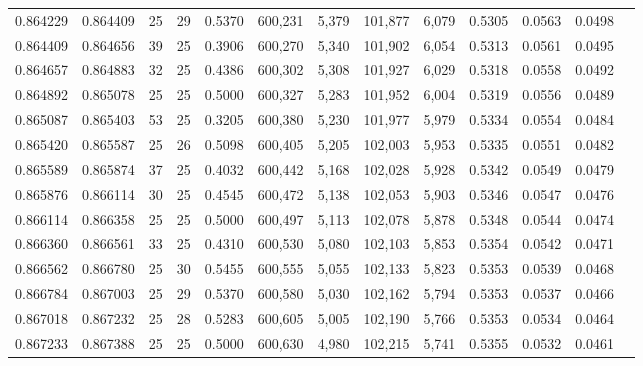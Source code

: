 \begin{tabular}{rrrrrrrrrrrrr}
0.864229 & 0.864409 &    25 &  29 &                                     0.5370 & 600,231 &   5,379 & 101,877 &   6,079 & 0.5305 & 0.0563 & 0.0498 \\
0.864409 & 0.864656 &    39 &  25 &                                     0.3906 & 600,270 &   5,340 & 101,902 &   6,054 & 0.5313 & 0.0561 & 0.0495 \\
0.864657 & 0.864883 &    32 &  25 &                                     0.4386 & 600,302 &   5,308 & 101,927 &   6,029 & 0.5318 & 0.0558 & 0.0492 \\
0.864892 & 0.865078 &    25 &  25 &                                     0.5000 & 600,327 &   5,283 & 101,952 &   6,004 & 0.5319 & 0.0556 & 0.0489 \\
0.865087 & 0.865403 &    53 &  25 &                                     0.3205 & 600,380 &   5,230 & 101,977 &   5,979 & 0.5334 & 0.0554 & 0.0484 \\
0.865420 & 0.865587 &    25 &  26 &                                     0.5098 & 600,405 &   5,205 & 102,003 &   5,953 & 0.5335 & 0.0551 & 0.0482 \\
0.865589 & 0.865874 &    37 &  25 &                                     0.4032 & 600,442 &   5,168 & 102,028 &   5,928 & 0.5342 & 0.0549 & 0.0479 \\
0.865876 & 0.866114 &    30 &  25 &                                     0.4545 & 600,472 &   5,138 & 102,053 &   5,903 & 0.5346 & 0.0547 & 0.0476 \\
0.866114 & 0.866358 &    25 &  25 &                                     0.5000 & 600,497 &   5,113 & 102,078 &   5,878 & 0.5348 & 0.0544 & 0.0474 \\
0.866360 & 0.866561 &    33 &  25 &                                     0.4310 & 600,530 &   5,080 & 102,103 &   5,853 & 0.5354 & 0.0542 & 0.0471 \\
0.866562 & 0.866780 &    25 &  30 &                                     0.5455 & 600,555 &   5,055 & 102,133 &   5,823 & 0.5353 & 0.0539 & 0.0468 \\
0.866784 & 0.867003 &    25 &  29 &                                     0.5370 & 600,580 &   5,030 & 102,162 &   5,794 & 0.5353 & 0.0537 & 0.0466 \\
0.867018 & 0.867232 &    25 &  28 &                                     0.5283 & 600,605 &   5,005 & 102,190 &   5,766 & 0.5353 & 0.0534 & 0.0464 \\
0.867233 & 0.867388 &    25 &  25 &                                     0.5000 & 600,630 &   4,980 & 102,215 &   5,741 & 0.5355 & 0.0532 & 0.0461 \\

\end{tabular}
